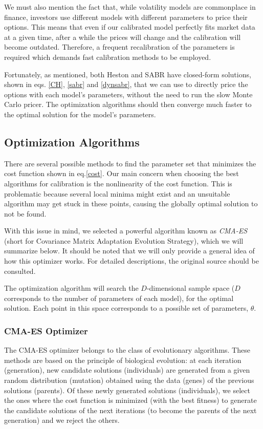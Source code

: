 We must also mention the fact that, while volatility models are commonplace in finance, investors use different models with different parameters to price their options. This means that even if our calibrated model perfectly fits market data at a given time, after a while the prices will change and the calibration will become outdated. Therefore, a frequent recalibration of the parameters is required which demands fast calibration methods to be employed.


Fortunately, as mentioned, both Heston and SABR have closed-form solutions, shown in eqs. \eqref{CH}, \eqref{sabr} and \eqref{dynsabr}, that we can use to directly price the options with each model's parameters, without the need to run the slow Monte Carlo pricer. The optimization algorithms should then converge much faster to the optimal solution for the model's parameters.





\subsection{Optimization Algorithms}
There are several possible methods to find the parameter set that minimizes the cost function shown in eq.\eqref{cost}.
Our main concern when choosing the best algorithms for calibration is the nonlinearity of the cost function. This is problematic because several local minima might exist and an unsuitable algorithm may get stuck in these points, causing the globally optimal solution to not be found.

With this issue in mind, we selected a powerful algorithm known as \emph{CMA-ES}~\citep{Hansen2} (short for Covariance Matrix Adaptation Evolution Strategy), which we will summarize below. It should be noted that we will only provide a general idea of how this optimizer works. For detailed descriptions, the original source should be consulted.

The optimization algorithm will search the $D$-dimensional sample space ($D$ corresponds to the number of parameters of each model), for the optimal solution. Each point in this space corresponds to a possible set of parameters, $\theta$.




\subsubsection{CMA-ES Optimizer}
The CMA-ES optimizer belongs to the class of evolutionary algorithms. These methods are based on the principle of biological evolution: at each iteration (generation), new candidate solutions (individuals) are generated from a given random distribution (mutation) obtained using the data (genes) of the previous solutions (parents). Of these newly generated solutions (individuals), we select the ones where the cost function is minimized (with the best fitness) to generate the candidate solutions of the next iterations (to become the parents of the next generation) and we reject the others.



